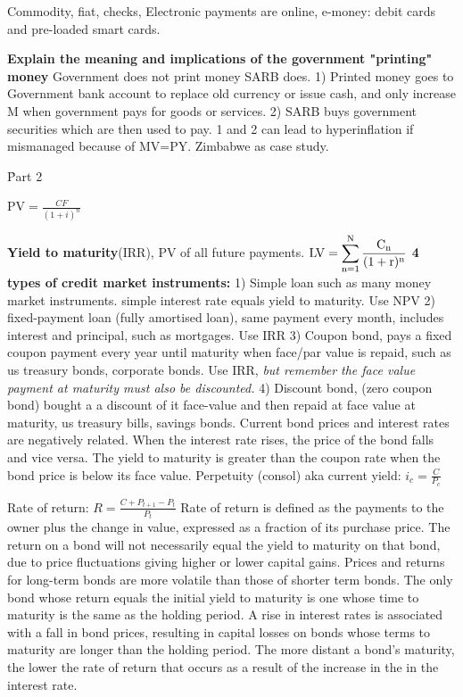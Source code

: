\documentclass[12pt]{examnotes}
\begin{document}
Commodity, fiat, checks, Electronic payments are online, e-money: debit cards and pre-loaded smart cards. 

\textbf{Explain the meaning and implications of the government "printing" money}
Government does not print money SARB does. 1) Printed money goes to Government bank account to replace old currency or issue cash, and only increase M when government pays for goods or services. 2) SARB buys government securities which are then used to pay. 1 and 2 can lead to hyperinflation if mismanaged because of MV=PY. Zimbabwe as case study.

\h{Part 2}


$\textrm{PV}=\displaystyle\frac{CF}{(1+i)^n}$ \quad

\textbf{Yield to maturity}(IRR), PV of all future payments. $\rm{LV} = \displaystyle\sum_{n=1}^{N} \frac{C_n}{(1+r)^{n}}$ 
\textbf{4 types of credit market instruments:} 
1) Simple loan such as many money market instruments. simple interest rate equals yield to maturity. Use NPV  
2) fixed-payment loan (fully amortised loan), same payment every month, includes interest and principal, such as mortgages. Use IRR 
3) Coupon bond, pays a fixed coupon payment every year until maturity when face/par value is repaid, such as us treasury bonds, corporate bonds. Use IRR, \emph{but remember the face value payment at maturity must also be discounted.}
4) Discount bond, (zero coupon bond) bought a a discount of it face-value and then repaid at face value at maturity, us treasury bills, savings bonds. 
Current bond prices and interest rates are negatively related. When the interest rate rises, the price of the bond falls and vice versa. The yield to  maturity is greater than the coupon rate when the bond price is below its face value. 
Perpetuity (consol) aka current yield: $i_c=\displaystyle\frac{C}{P_c}$ 

Rate of return: $R=\displaystyle \frac{C+P_{t+1}-P_t}{P_t}$
Rate of return is defined as the payments to the owner plus the change in value, expressed as a fraction of its purchase price.
The return on a bond will not necessarily equal the yield to maturity on that bond, due to price fluctuations giving higher or lower capital gains. Prices and returns for long-term bonds are more volatile than those of shorter term bonds. 
The only bond whose return equals the initial yield to maturity is one whose time to maturity is the same as the holding period.
A rise in interest rates is associated with a fall in bond prices, resulting in capital losses on bonds whose terms to maturity are longer than the holding period.
The more distant a bond's maturity, the lower the rate of return that occurs as a result of the increase in the in the interest rate. \\
\end{document}
